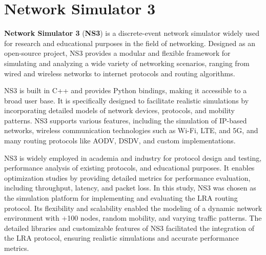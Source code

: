 \documentclass[../report.tex]{subfiles}
\begin{document}
\section{Network Simulator 3}
\textbf{Network Simulator 3} (\textbf{NS3}) is a discrete-event network simulator widely used for research and educational purposes in the field of networking. Designed as an open-source project, NS3 provides a modular and flexible framework for simulating and analyzing a wide variety of networking scenarios, ranging from wired and wireless networks to internet protocols and routing algorithms.

NS3 is built in C++ and provides Python bindings, making it accessible to a broad user base. It is specifically designed to facilitate realistic simulations by incorporating detailed models of network devices, protocols, and mobility patterns. NS3 supports various features, including the simulation of IP-based networks, wireless communication technologies such as Wi-Fi, LTE, and 5G, and many routing protocols like AODV, DSDV, and custom implementations.

NS3 is widely employed in academia and industry for protocol design and testing, performance analysis of existing protocols, and educational purposes. It enables optimization studies by providing detailed metrics for performance evaluation, including throughput, latency, and packet loss. In this study, NS3 was chosen as the simulation platform for implementing and evaluating the LRA routing protocol. Its flexibility and scalability enabled the modeling of a dynamic network environment with +100 nodes, random mobility, and varying traffic patterns. The detailed libraries and customizable features of NS3 facilitated the integration of the LRA protocol, ensuring realistic simulations and accurate performance metrics.
\end{document}

